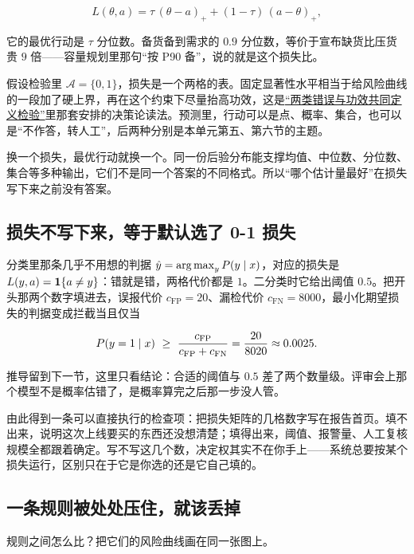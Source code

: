 \[
L(\theta,a)=\tau\,(\theta-a)_+ + (1-\tau)\,(a-\theta)_+,
\]

它的最优行动是 \(\tau\) 分位数。备货备到需求的 \(0.9\) 分位数，等价于宣布缺货比压货贵 \(9\) 倍——容量规划里那句``按 P90 备''，说的就是这个损失比。

假设检验里 \(\mathcal A=\{0,1\}\)，损失是一个两格的表。固定显著性水平相当于给风险曲线的一段加了硬上界，再在这个约束下尽量抬高功效，这是\hyperref[sec:11-Mathematical-Statistics/05-Hypothesis-Testing/01]{``两类错误与功效共同定义检验''}里那套安排的决策论读法。预测里，行动可以是点、概率、集合，也可以是``不作答，转人工''，后两种分别是本单元第五、第六节的主题。

换一个损失，最优行动就换一个。同一份后验分布能支撑均值、中位数、分位数、集合等多种输出，它们不是同一个答案的不同格式。所以``哪个估计量最好''在损失写下来之前没有答案。

\subsection{损失不写下来，等于默认选了 0-1 损失}

分类里那条几乎不用想的判据 \(\hat y=\operatorname*{arg\,max}_y P(y\mid x)\)，对应的损失是 \(L(y,a)=\mathbf{1}\{a\ne y\}\)：错就是错，两格代价都是 \(1\)。二分类时它给出阈值 \(0.5\)。把开头那两个数字填进去，误报代价 \(c_{\mathrm{FP}}=20\)、漏检代价 \(c_{\mathrm{FN}}=8000\)，最小化期望损失的判据变成拦截当且仅当

\[
P(y=1\given x)\ \ge\ \frac{c_{\mathrm{FP}}}{c_{\mathrm{FP}}+c_{\mathrm{FN}}}=\frac{20}{8020}\approx 0.0025 .
\]

推导留到下一节，这里只看结论：合适的阈值与 \(0.5\) 差了两个数量级。评审会上那个模型不是概率估错了，是概率算完之后那一步没人管。

由此得到一条可以直接执行的检查项：把损失矩阵的几格数字写在报告首页。填不出来，说明这次上线要买的东西还没想清楚；填得出来，阈值、报警量、人工复核规模全都跟着确定。写不写这几个数，决定权其实不在你手上——系统总要按某个损失运行，区别只在于它是你选的还是它自己填的。

\subsection{一条规则被处处压住，就该丢掉}

规则之间怎么比？把它们的风险曲线画在同一张图上。

